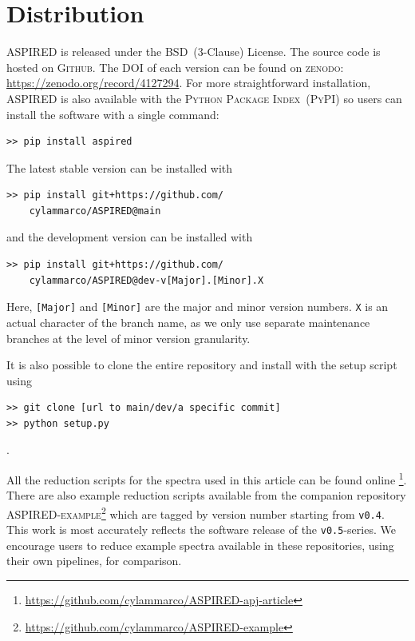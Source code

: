 \documentclass[linenumbers, twocolumn]{aastex631}
\begin{document}
\section{Distribution}
\label{sec:distribution}

\textsc{ASPIRED} is released under the BSD~(3-Clause) License. The source code
is hosted on \textsc{Github}. The DOI of each version can be found on 
\textsc{zenodo}: \url{https://zenodo.org/record/4127294}. For more
straightforward installation, \textsc{ASPIRED} is also available with the
\textsc{Python Package Index}~(\textsc{PyPI}) so users can install the software with a single command: 
\begin{verbatim}
>> pip install aspired
\end{verbatim}
The latest stable version can be installed with
\begin{verbatim}
>> pip install git+https://github.com/
    cylammarco/ASPIRED@main
\end{verbatim}
and the development version can be installed with 
\begin{verbatim}
>> pip install git+https://github.com/
    cylammarco/ASPIRED@dev-v[Major].[Minor].X
\end{verbatim} Here, \verb+[Major]+ and \verb+[Minor]+ are the major and minor
version numbers. \verb+X+ is an actual character of the branch name, as we only
use separate maintenance branches at the level of minor version granularity.

It is also possible to clone the entire repository
and install with the setup script using
\begin{verbatim}
>> git clone [url to main/dev/a specific commit]
>> python setup.py
\end{verbatim}
.

All the reduction scripts for the spectra used in this article can be found online
\footnote{\url{https://github.com/cylammarco/ASPIRED-apj-article}}. There are also example
reduction scripts available from the companion repository
\textsc{ASPIRED-example}\footnote{\url{https://github.com/cylammarco/ASPIRED-example}}
which are tagged by version number starting from \texttt{v0.4}. This work is most
accurately reflects the software release of the \texttt{v0.5}-series.
We encourage users to reduce example spectra available in these repositories, using their own pipelines, for comparison.


\end{document}
